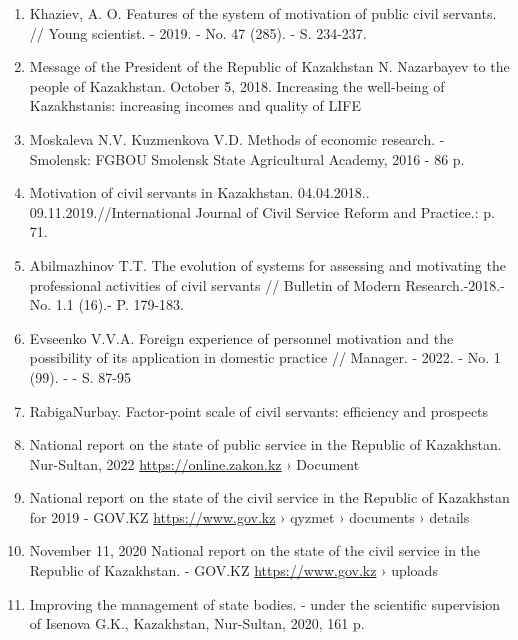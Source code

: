 \begin{enumerate}
\item
Khaziev, A. O. Features of the system of motivation of public civil
servants. // Young scientist. - 2019. - No. 47 (285). - S. 234-237.

\item
Message of the President of the Republic of Kazakhstan N. Nazarbayev
to the people of Kazakhstan. October 5, 2018. Increasing the well-being
of Kazakhstanis: increasing incomes and quality of LIFE

\item
Moskaleva N.V. Kuzmenkova V.D. Methods of economic research. -
Smolensk: FGBOU Smolensk State Agricultural Academy, 2016 - 86 p.

\item
Motivation of civil servants in Kazakhstan. 04.04.2018..
09.11.2019.//International Journal of Civil Service Reform and
Practice.: p. 71.

\item
Abilmazhinov T.T. The evolution of systems for assessing and
motivating the professional activities of civil servants // Bulletin of
Modern Research.-2018.- No. 1.1 (16).- P. 179-183.

\item
Evseenko V.V.A. Foreign experience of personnel motivation and the
possibility of its application in domestic practice // Manager. - 2022.
- No. 1 (99). - - S. 87-95

\item
RabigaNurbay. Factor-point scale of civil servants: efficiency and
prospects

\item
National report on the state of public service in the Republic of
Kazakhstan. Nur-Sultan, 2022 \url{https://online.zakon.kz} › Document

\item
National report on the state of the civil service in the Republic of
Kazakhstan for 2019 - GOV.KZ \url{https://www.gov.kz} › qyzmet › documents ›
details

\item
November 11, 2020 National report on the state of the civil service
in the Republic of Kazakhstan. - GOV.KZ \url{https://www.gov.kz} › uploads

\item
Improving the management of state bodies. - under the scientific
supervision of Isenova G.K., Kazakhstan, Nur-Sultan, 2020, 161 p.


\end{enumerate}
